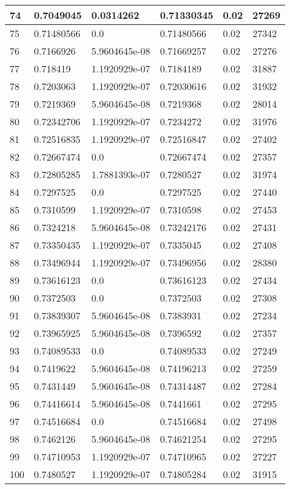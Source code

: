\begin{longtable}{|l|l|l|l|l|l|}
74 & 0.7049045 & 0.0314262 & 0.71330345 & 0.02 & 27269 \\ \hline 
75 & 0.71480566 & 0.0 & 0.71480566 & 0.02 & 27342 \\ \hline 
76 & 0.7166926 & 5.9604645e-08 & 0.71669257 & 0.02 & 27276 \\ \hline 
77 & 0.718419 & 1.1920929e-07 & 0.7184189 & 0.02 & 31887 \\ \hline 
78 & 0.7203063 & 1.1920929e-07 & 0.72030616 & 0.02 & 31932 \\ \hline 
79 & 0.7219369 & 5.9604645e-08 & 0.7219368 & 0.02 & 28014 \\ \hline 
80 & 0.72342706 & 1.1920929e-07 & 0.7234272 & 0.02 & 31976 \\ \hline 
81 & 0.72516835 & 1.1920929e-07 & 0.72516847 & 0.02 & 27402 \\ \hline 
82 & 0.72667474 & 0.0 & 0.72667474 & 0.02 & 27357 \\ \hline 
83 & 0.72805285 & 1.7881393e-07 & 0.7280527 & 0.02 & 31974 \\ \hline 
84 & 0.7297525 & 0.0 & 0.7297525 & 0.02 & 27440 \\ \hline 
85 & 0.7310599 & 1.1920929e-07 & 0.7310598 & 0.02 & 27453 \\ \hline 
86 & 0.7324218 & 5.9604645e-08 & 0.73242176 & 0.02 & 27431 \\ \hline 
87 & 0.73350435 & 1.1920929e-07 & 0.7335045 & 0.02 & 27408 \\ \hline 
88 & 0.73496944 & 1.1920929e-07 & 0.73496956 & 0.02 & 28380 \\ \hline 
89 & 0.73616123 & 0.0 & 0.73616123 & 0.02 & 27434 \\ \hline 
90 & 0.7372503 & 0.0 & 0.7372503 & 0.02 & 27308 \\ \hline 
91 & 0.73839307 & 5.9604645e-08 & 0.7383931 & 0.02 & 27234 \\ \hline 
92 & 0.73965925 & 5.9604645e-08 & 0.7396592 & 0.02 & 27357 \\ \hline 
93 & 0.74089533 & 0.0 & 0.74089533 & 0.02 & 27249 \\ \hline 
94 & 0.7419622 & 5.9604645e-08 & 0.74196213 & 0.02 & 27259 \\ \hline 
95 & 0.7431449 & 5.9604645e-08 & 0.74314487 & 0.02 & 27284 \\ \hline 
96 & 0.74416614 & 5.9604645e-08 & 0.7441661 & 0.02 & 27295 \\ \hline 
97 & 0.74516684 & 0.0 & 0.74516684 & 0.02 & 27498 \\ \hline 
98 & 0.7462126 & 5.9604645e-08 & 0.74621254 & 0.02 & 27295 \\ \hline 
99 & 0.74710953 & 1.1920929e-07 & 0.74710965 & 0.02 & 27227 \\ \hline 
100 & 0.7480527 & 1.1920929e-07 & 0.74805284 & 0.02 & 31915 \\ \hline 
\end{longtable}